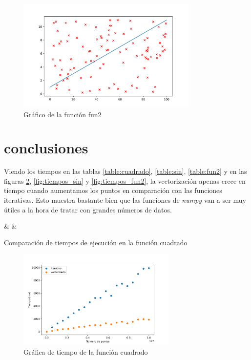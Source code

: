 \documentclass[6pt]{../../shared/AiTex}
\begin{document}
\begin{figure}[H]
    \centering
    \includegraphics[width=0.8\textwidth]{./imagenes/fun2.png}
    \caption{Gráfico de la función fun2}
    \label{fig:fun_fun2}
\end{figure}

\section{conclusiones}

Viendo los tiempos en las tablas \ref{table:cuadrado}, \ref{table:sin}, \ref{table:fun2} y en las figuras \ref{fig:tiempos_cuadrado}, \ref{fig:tiempos_sin} y \ref{fig:tiempos_fun2}, la vectorización apenas crece en tiempo cuando aumentamos los puntos en comparación con las funciones iterativas. Esto muestra bastante bien que las funciones de \textit{numpy} van a ser muy útiles a la hora de tratar con grandes números de datos.

\begin{table}[H]
    \centering
    {\casos & \iterativo & \vectorizado}
    \caption{Comparación de tiempos de ejecución en la función cuadrado}
    \label{table:cuadrado}
\end{table}

\begin{figure}[H]
    \centering
    \includegraphics[width=0.7\textwidth]{./imagenes/tiempos_cuadrado.png}
    \caption{Gráfica de tiempo de la función cuadrado}
    \label{fig:tiempos_cuadrado}
\end{figure}
\end{document}
